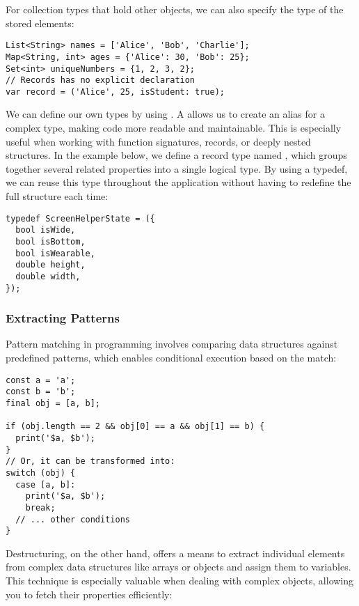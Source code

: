 \noindent For collection types that hold other objects, we can also specify the type of the stored elements:

\begin{lstlisting}
List<String> names = ['Alice', 'Bob', 'Charlie'];
Map<String, int> ages = {'Alice': 30, 'Bob': 25};
Set<int> uniqueNumbers = {1, 2, 3, 2};
// Records has no explicit declaration
var record = ('Alice', 25, isStudent: true);
\end{lstlisting}

\noindent We can define our own types by using . A  allows us to create an alias for a complex
type, making code more readable and maintainable. This is especially useful when working with function signatures,
records, or deeply nested structures. In the example below, we define a record type named ,
which groups together several related properties into a single logical type. By using a typedef, we can reuse this
type throughout the application without having to redefine the full structure each time:

\begin{lstlisting}
typedef ScreenHelperState = ({
  bool isWide,
  bool isBottom,
  bool isWearable,
  double height,
  double width,
});
\end{lstlisting}


\subsubsection{Extracting Patterns}

Pattern matching in programming involves comparing data structures against predefined patterns, which enables
conditional execution based on the match:

\begin{lstlisting}
const a = 'a';
const b = 'b';
final obj = [a, b];

if (obj.length == 2 && obj[0] == a && obj[1] == b) {
  print('$a, $b');
}
// Or, it can be transformed into:
switch (obj) {
  case [a, b]:
    print('$a, $b');
    break;
  // ... other conditions
}
\end{lstlisting}

\noindent Destructuring, on the other hand, offers a means to extract individual elements from complex data structures
like arrays or objects and assign them to variables. This technique is especially valuable when dealing with complex
objects, allowing you to fetch their properties efficiently:

